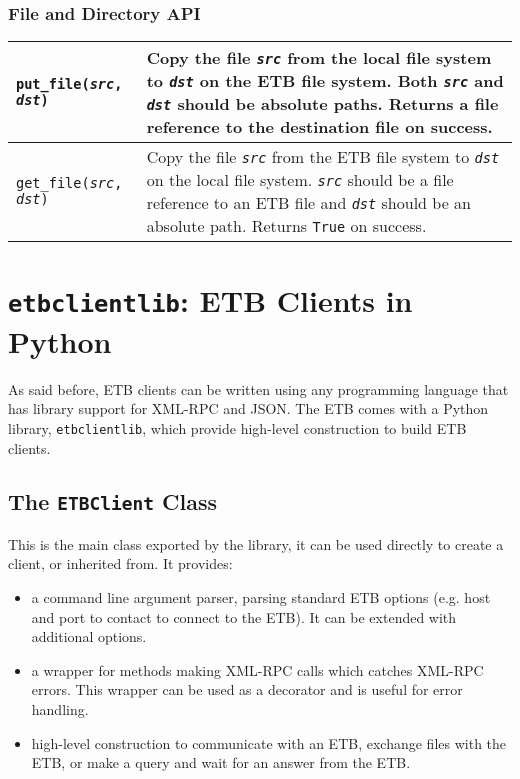 \documentclass{article}
\begin{document}
\subsubsection{File and Directory API}

\begin{tabular}{|l|p{9cm}|}
  \hline
  {\tt put\_file({\it src}, {\it dst})} &
  Copy the file {\tt \it src} from the local file system to {\tt \it dst} on
  the ETB file system. Both {\tt \it src} and {\tt \it dst} should be absolute
  paths. Returns a file reference to the destination file on success.\\
  \hline
  {\tt get\_file({\it src}, {\it dst})} &
  Copy the file {\tt \it src} from the ETB file system to {\tt \it dst} on
  the local file system. {\tt \it src} should be a file reference to an ETB file
  and {\tt \it dst} should be an absolute path.
  Returns {\tt True} on success. \\
  \hline
\end{tabular}

\section{{\tt etbclientlib}: ETB Clients in Python}

As said before, ETB clients can be written using any programming
language that has library support for XML-RPC and JSON. The ETB comes
with a Python library, {\tt etbclientlib}, which provide high-level
construction to build ETB clients.

\subsection{The {\tt ETBClient} Class}

This is the main class exported by the library, it can be used
directly to create a client, or inherited from. It provides:
\begin{itemize}
\item a command line argument parser, parsing standard ETB options
  (e.g. host and port to contact to connect to the ETB). It can be
  extended with additional options.
\item a wrapper for methods making XML-RPC calls which catches XML-RPC
  errors. This wrapper can be used as a decorator and is useful for
  error handling.
\item high-level construction to communicate with an ETB, exchange
  files with the ETB, or make a query and wait for an answer from the
  ETB.
\end{itemize}
\end{document}
